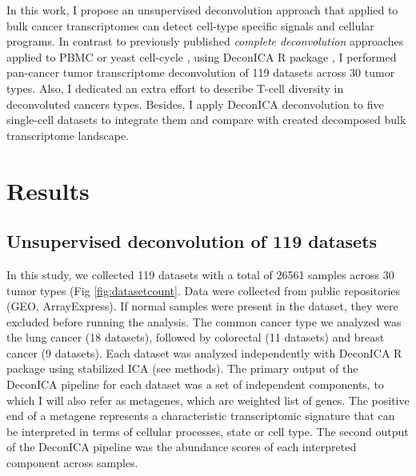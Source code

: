 \documentclass[12pt,]{book}
\theoremstyle{definition}
\theoremstyle{definition}
\theoremstyle{definition}
\theoremstyle{remark}
\begin{document}
In this work, I propose an unsupervised deconvolution approach that
applied to bulk cancer transcriptomes can detect cell-type specific
signals and cellular programs. In contrast to previously published
\emph{complete deconvolution} approaches applied to PBMC
\citep{Repsilber2010, Gaujoux2012}or yeast cell-cycle \citep{Wang2016},
using DeconICA R package \citep{Czerwinska2018}, I performed pan-cancer
tumor transcriptome deconvolution of 119 datasets across 30 tumor types.
Also, I dedicated an extra effort to describe T-cell diversity in
deconvoluted cancers types. Besides, I apply DeconICA deconvolution to
five single-cell datasets to integrate them and compare with created
decomposed bulk transcriptome landscape.

\hypertarget{results-1}{%
\section{Results}\label{results-1}}

\hypertarget{unsupervised-deconvolution-of-119-datasets}{%
\subsection{Unsupervised deconvolution of 119
datasets}\label{unsupervised-deconvolution-of-119-datasets}}

In this study, we collected 119 datasets with a total of 26561 samples
across 30 tumor types (Fig \ref{fig:datasetcount}. Data were collected
from public repositories (GEO, ArrayExpress). If normal samples were
present in the dataset, they were excluded before running the analysis.
The common cancer type we analyzed was the lung cancer (18 datasets),
followed by colorectal (11 datasets) and breast cancer (9 datasets).
Each dataset was analyzed independently with DeconICA R package using
stabilized ICA (see methods). The primary output of the DeconICA
pipeline for each dataset was a set of independent components, to which
I will also refer as metagenes, which are weighted list of genes. The
positive end of a metagene represents a characteristic transcriptomic
signature that can be interpreted in terms of cellular processes, state
or cell type. The second output of the DeconICA pipeline was the
abundance scores of each interpreted component across samples.
\end{document}
